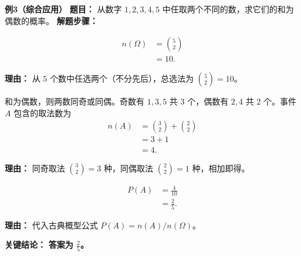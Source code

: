 \begin{examplebox}
	\medskip
	\textbf{\textcolor{CExample}{例3（综合应用）}}
	\textbf{\textcolor{CExample}{题目：}}
	从数字 $1,2,3,4,5$ 中任取两个不同的数，求它们的和为偶数的概率。
	\textbf{\textcolor{CExample}{解题步骤：}}
	\begin{description}[style=nextline, leftmargin=2.8em, labelsep=0.5em, itemsep=0.45em]
		\item[\textbf{第一步（样本空间）：}]
			\[
				\begin{aligned}
					n(\Omega) &= \binom{5}{2} \\ &= 10.
			\end{aligned}
			\]
			\par\textbf{理由：} 从 $5$ 个数中任选两个（不分先后），总选法为 $\binom{5}{2}=10$。
		\item[\textbf{第二步（分类计数）：}]
			和为偶数，则两数同奇或同偶。奇数有 $1,3,5$ 共 $3$ 个，偶数有 $2,4$ 共 $2$ 个。事件 $A$ 包含的取法数为
			\[
				\begin{aligned}
					n(A) &= \binom{3}{2}+\binom{2}{2} \\ &= 3+1 \\ &= 4.
			\end{aligned}
			\]
			\par\textbf{理由：} 同奇取法 $\binom{3}{2}=3$ 种，同偶取法 $\binom{2}{2}=1$ 种，相加即得。
		\item[\textbf{第三步（概率计算）：}]
			\[
				\begin{aligned}
					P(A) &= \frac{4}{10} \\ &= \frac{2}{5}.
			\end{aligned}
			\]
			\par\textbf{理由：} 代入古典概型公式 $P(A)=n(A)/n(\Omega)$。
	\end{description}
	\textbf{\textcolor{CExample}{关键结论：}}
	\textbf{答案为 $\displaystyle\frac{2}{5}$。}
\end{examplebox}
